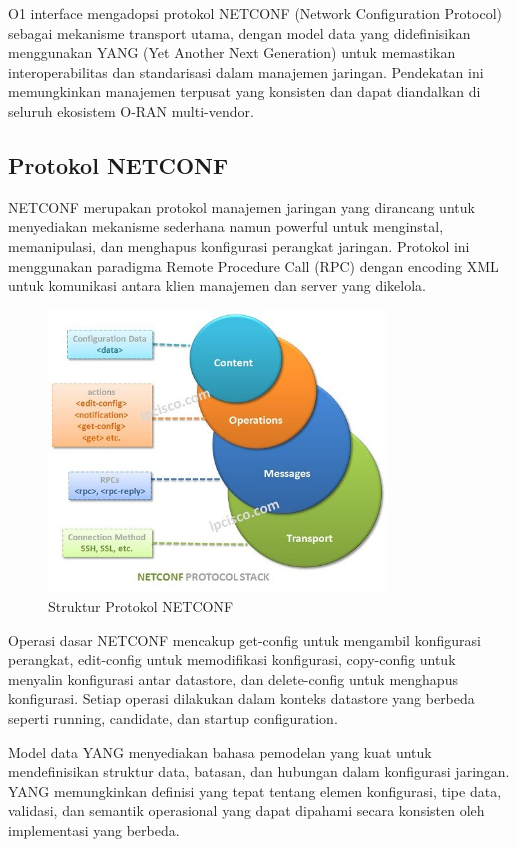 O1 interface mengadopsi protokol NETCONF (Network Configuration Protocol) sebagai mekanisme transport utama, dengan model data yang didefinisikan menggunakan YANG (Yet Another Next Generation) untuk memastikan interoperabilitas dan standarisasi dalam manajemen jaringan. Pendekatan ini memungkinkan manajemen terpusat yang konsisten dan dapat diandalkan di seluruh ekosistem O-RAN multi-vendor.

\subsection{Protokol NETCONF}

NETCONF merupakan protokol manajemen jaringan yang dirancang untuk menyediakan mekanisme sederhana namun powerful untuk menginstal, memanipulasi, dan menghapus konfigurasi perangkat jaringan. Protokol ini menggunakan paradigma Remote Procedure Call (RPC) dengan encoding XML untuk komunikasi antara klien manajemen dan server yang dikelola.

\begin{figure}[h]
    \centering
    \includegraphics[width=0.8\textwidth]{assets/pics/bab3_15.png}
    \caption{Struktur Protokol NETCONF}
    \label{fig:netconf_structure}
\end{figure}

Operasi dasar NETCONF mencakup get-config untuk mengambil konfigurasi perangkat, edit-config untuk memodifikasi konfigurasi, copy-config untuk menyalin konfigurasi antar datastore, dan delete-config untuk menghapus konfigurasi. Setiap operasi dilakukan dalam konteks datastore yang berbeda seperti running, candidate, dan startup configuration.

Model data YANG menyediakan bahasa pemodelan yang kuat untuk mendefinisikan struktur data, batasan, dan hubungan dalam konfigurasi jaringan. YANG memungkinkan definisi yang tepat tentang elemen konfigurasi, tipe data, validasi, dan semantik operasional yang dapat dipahami secara konsisten oleh implementasi yang berbeda.

